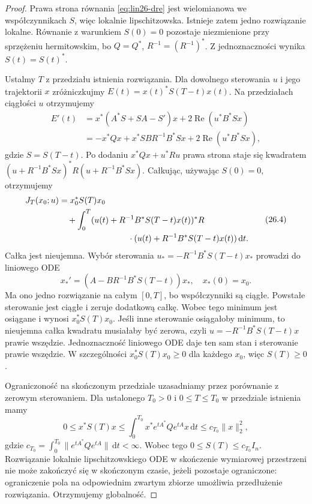 \begin{proof}
Prawa strona równania
\eqref{eq:lin26-dre}
jest wielomianowa
we współczynnikach \(S\),
więc lokalnie lipschitzowska.
Istnieje zatem jedno
rozwiązanie lokalne.
Równanie z warunkiem \(S(0)=0\)
pozostaje niezmienione
przy sprzężeniu hermitowskim,
bo \(Q=Q^*\),
\(R^{-1}=(R^{-1})^*\).
Z jednoznaczności wynika
\(S(t)=S(t)^*\).

Ustalmy \(T\) z przedziału
istnienia rozwiązania.
Dla dowolnego sterowania \(u\)
i jego trajektorii \(x\)
zróżniczkujmy
\(E(t)=x(t)^*S(T-t)x(t)\).
Na przedziałach ciągłości \(u\)
otrzymujemy
\[
 \begin{aligned}
 E'(t)
 &=x^*(A^*S+SA-S')x
      +2\operatorname{Re}(u^*B^*Sx)\\
 &=-x^*Qx+x^*SBR^{-1}B^*Sx
      +2\operatorname{Re}(u^*B^*Sx),
 \end{aligned}
\]
gdzie \(S=S(T-t)\).
Po dodaniu \(x^*Qx+u^*Ru\)
prawa strona staje się
kwadratem
\((u+R^{-1}B^*Sx)^*
 R(u+R^{-1}B^*Sx)\).
Całkując, używając \(S(0)=0\),
otrzymujemy
\[
 \begin{aligned}
 J_T(x_0;u)
 &=x_0^*S(T)x_0\\
 &\quad+\int_0^T
  (u(t)+R^{-1}B^*S(T-t)x(t))^*
  R\\
 &\hspace{29mm}\cdot
  (u(t)+R^{-1}B^*S(T-t)x(t))
  \,\mathrm dt.
 \end{aligned}
 \tag{26.4}\label{eq:lin26-finite-square}
\]
Całka jest nieujemna.
Wybór sterowania
\(u_*=-R^{-1}B^*S(T-t)x_*\)
prowadzi do liniowego ODE
\[
 x_*'=(A-BR^{-1}B^*S(T-t))x_*,
 \quad x_*(0)=x_0.
\]
Ma ono jedno rozwiązanie
na całym \([0,T]\),
bo współczynniki są ciągłe.
Powstałe sterowanie
jest ciągłe i zeruje
dodatkową całkę.
Wobec tego minimum
jest osiągane i wynosi
\(x_0^*S(T)x_0\).
Jeśli inne sterowanie
osiągałoby minimum,
to nieujemna całka
kwadratu musiałaby być
zerowa, czyli
\(u=-R^{-1}B^*S(T-t)x\)
prawie wszędzie.
Jednoznaczność liniowego ODE
daje ten sam stan
i sterowanie prawie wszędzie.
W szczególności
\(x_0^*S(T)x_0\ge0\)
dla każdego \(x_0\),
więc \(S(T)\ge0\).

Ograniczoność na skończonym
przedziale uzasadniamy
przez porównanie z
zerowym sterowaniem.
Dla ustalonego \(T_0>0\)
i \(0\le T\le T_0\)
w przedziale istnienia mamy
\[
 0\le x^*S(T)x
 \le\int_0^{T_0}
    x^*e^{tA^*}Qe^{tA}x
    \,\mathrm dt
 \le c_{T_0}\|x\|_2^2,
\]
gdzie
\(c_{T_0}=\int_0^{T_0}
  \|e^{tA^*}Qe^{tA}\|
  \,\mathrm dt<\infty\).
Wobec tego
\(0\le S(T)\le c_{T_0}I_n\).
Rozwiązanie lokalnie
lipschitzowskiego ODE
w skończenie wymiarowej
przestrzeni nie może
zakończyć się w skończonym
czasie, jeżeli pozostaje
ograniczone: ograniczenie
pola na odpowiednim zwartym
zbiorze umożliwia
przedłużenie rozwiązania.
Otrzymujemy globalność.


\end{proof}
